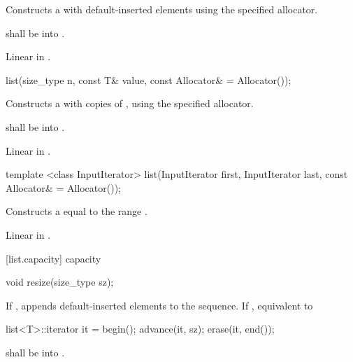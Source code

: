 \begin{itemdescr}
\pnum
\effects Constructs a  with
 default-inserted elements using the specified allocator.

\pnum
\requires {} shall be  into .

\pnum
\complexity
Linear in
.
\end{itemdescr}

%
%
\begin{itemdecl}
list(size_type n, const T& value, const Allocator& = Allocator());
\end{itemdecl}

\begin{itemdescr}
\pnum
\effects
Constructs a
with
copies of
,
using the specified allocator.

\pnum
\requires {} shall be  into .

\pnum
\complexity
Linear in
.
\end{itemdescr}

%
%
\begin{itemdecl}
template <class InputIterator>
  list(InputIterator first, InputIterator last, const Allocator& = Allocator());
\end{itemdecl}

\begin{itemdescr}
\pnum
\effects
Constructs a
equal to the range
.

\pnum
\complexity
Linear in
.
\end{itemdescr}

[list.capacity]{ capacity}

%
\begin{itemdecl}
void resize(size_type sz);
\end{itemdecl}

\begin{itemdescr}
\pnum
\effects
If ,
appends  default-inserted elements to the
sequence.
If , equivalent to

\begin{codeblock}
list<T>::iterator it = begin();
advance(it, sz);
erase(it, end());
\end{codeblock}


\pnum
\requires {} shall be
 into .
\end{itemdescr}

